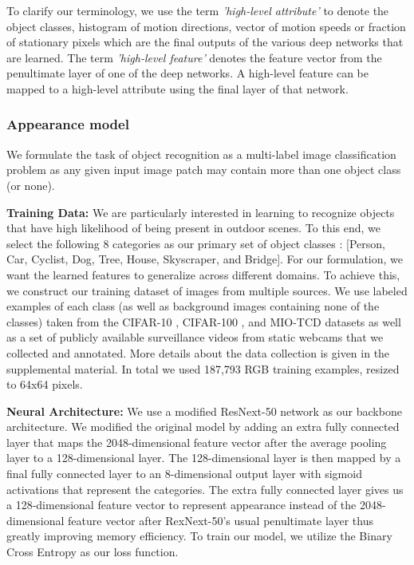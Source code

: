 To clarify our terminology, we use the term {\em 'high-level attribute'} to denote the object classes, histogram of motion directions, vector of motion speeds or fraction of stationary pixels which are the final outputs of the various deep networks that are learned.  The term {\em 'high-level feature'} denotes the feature vector from the penultimate layer of one of the deep networks.  A high-level feature can be mapped to a high-level attribute using the final layer of that network.
\vspace{-10pt}
\subsubsection{Appearance model}
We formulate the task of object recognition as a multi-label image classification problem as any given input image patch may contain more than one object class (or none). 

\textbf{Training Data:}
We are particularly interested in learning to recognize objects that have high likelihood of being present in outdoor scenes. To this end, we select the following 8 categories as our primary set of object classes : [Person, Car, Cyclist, Dog, Tree, House, Skyscraper, and Bridge]. For our formulation, we want the learned features to generalize across different domains. To achieve this, we construct our training dataset of images from multiple sources. 
We use labeled examples of each class (as well as background images containing none of the classes) taken from the CIFAR-10 \cite{krizhevsky2009learning}, CIFAR-100 \cite{krizhevsky2009learning}, and MIO-TCD \cite{luo2018mio} datasets as well as a set of publicly available surveillance videos from static webcams that we collected and annotated.  More details about the data collection is given in the supplemental material.  In total we used 187,793 RGB training examples, resized to 64x64 pixels.

\textbf{Neural Architecture:}
We use a modified ResNext-50 network \cite{xie2017aggregated} as our backbone architecture. We modified the original model by adding an extra fully connected layer that maps the 2048-dimensional feature vector after the average pooling layer to a 128-dimensional layer. The 128-dimensional layer is then mapped by a final fully connected layer to an 8-dimensional output layer with sigmoid activations that represent the categories.  The extra fully connected layer gives us a 128-dimensional feature vector to represent appearance instead of the 2048-dimensional feature vector after RexNext-50's usual penultimate layer thus greatly improving memory efficiency.
To train our model, we utilize the Binary Cross Entropy as our loss function.  

